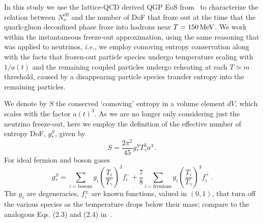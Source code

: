 In this study we use the lattice-QCD derived QGP EoS from~\cite{Borsanyi:2013bia} to characterize the relation between $N^{\text{eff}}_{\nu}$ and the number of DoF that froze out at the time that the quark-gluon deconfined phase froze into hadrons near $T=150\text{\,MeV}$. We work within the instantaneous freeze-out approximation, using the same reasoning that was applied to neutrinos, {\it i.e.\/}, we employ comoving entropy conservation along with the facts that frozen-out particle species undergo temperature scaling with $1/a(t)$ and the remaining coupled particles undergo reheating at each $T\simeq m$ threshold, caused by a disappearing particle species transfer entropy into the remaining particles.



We denote by $S$ the conserved `comoving' entropy in a volume element $dV$, which scales with the factor $a(t)^3$. As we are no longer only considering just the neutrino freeze-out, here we employ the definition of the effective number of entropy DoF, $g_*^S$, given by
\begin{equation}
S=\frac{2\pi^2}{45}g^S_*T_\gamma^3 a^3\,.
\end{equation} 
For ideal fermion and boson gases
\begin{equation}
g_*^S=\!\!\!\!\sum_{i=\text{bosons}}\!\!\!\!g_i \left(\frac{T_i}{T_\gamma}\right)^3\!\!\!f_i^-+\frac{7}{8}\!\!\!\sum_{i=\text{fermions}}\!\!\!\! g_i \left(\frac{T_i}{T_\gamma}\right)^3\!\!\!f_i^+\,.
\end{equation}
The $g_i$ are degeneracies, $f_i^\pm$ are known functions, valued in $(0,1)$, that turn off the various species as the temperature drops below their mass; compare to the analogous Eqs. (2.3) and (2.4) in~\cite{Blennow:2012de}. 


